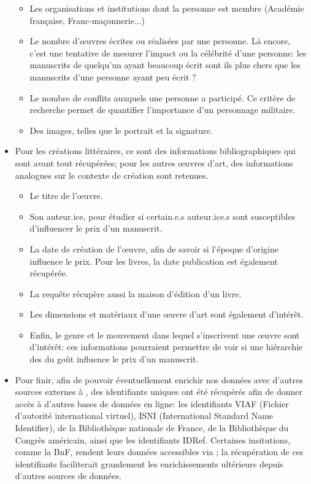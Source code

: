 \begin{itemize}
\begin{itemize}
		\item Les organisations et institutions dont la personne est membre (Académie française, Franc-maçonnerie...)
		\item Le nombre d'œuvres écrites ou réalisées par une personne. Là encore, c'est une tentative de mesurer l'impact ou la célébrité d'une personne: les manuscrits de quelqu'un ayant beaucoup écrit sont ils plus chers que les manuscrits d'une personne ayant peu écrit ?
		\item Le nombre de conflits auxquels une personne a participé. Ce critère de recherche permet de quantifier l'importance d'un personnage militaire.
		\item Des images, telles que le portrait et la signature.
	\end{itemize}
	\item Pour les créations littéraires, ce sont des informations bibliographiques qui sont avant tout récupérées; pour les autres œuvres d'art, des informations analogues sur le contexte de création sont retenues.
	\begin{itemize}
		\item Le titre de l'œuvre.
		\item Son auteur.ice, pour étudier si certain.e.s auteur.ice.s sont susceptibles d'influencer le prix d'un manuscrit.
		\item La date de création de l'œuvre, afin de savoir si l'époque d'origine influence le prix. Pour les livres, la date publication est également récupérée.
		\item La requête récupère aussi la maison d'édition d'un livre.
		\item Les dimensions et matériaux d'une œuvre d'art sont également d'intérêt.
		\item Enfin, le genre et le mouvement dans lequel s'inscrivent une œuvre sont d'intérêt: ces informations pourraient permettre de voir si une hiérarchie des du goût influence le prix d'un manuscrit.
	\end{itemize}
	\item Pour finir, afin de pouvoir éventuellement enrichir nos données avec d'autres sources externes à \wkd{}, des identifiants uniques ont été récupérés afin de donner accès à d'autres bases de données en ligne: les identifiants VIAF (Fichier d'autorité international virtuel), ISNI (International Standard Name Identifier), de la Bibliothèque nationale de France, de la Bibliothèque du Congrès américain, ainsi que les identifiants IDRef. Certaines insitutions, comme la BnF, rendent leurs données accessibles via \sparql{}; la récupération de ces identifiants faciliterait grandement les enrichissements ultérieurs depuis d'autres sources de données.
\end{itemize}

